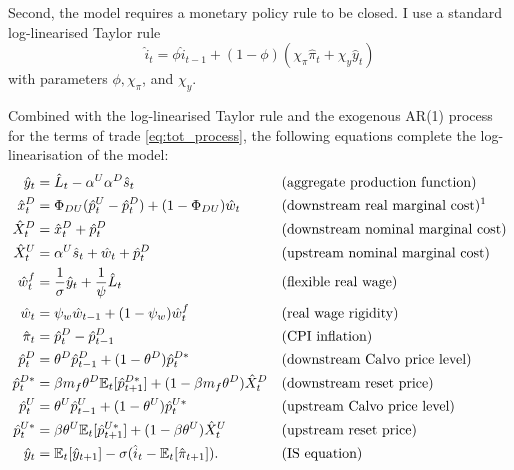 \documentclass[a4paper, 12pt]{article}
\newcommand{\E}{\mathbb{E}}
\theoremstyle{definition*}
\begin{document}
Second, the model requires a monetary policy rule to be closed.
I use a standard log-linearised Taylor rule
\begin{equation}
  \hat i_t = \phi\hat i_{t-1} + (1 - \phi)(\chi_\pi\hat\pi_t + \chi_y\hat y_t)
\end{equation}
with parameters $\phi, \chi_\pi$, and $\chi_y$.

Combined with the log-linearised Taylor rule and the exogenous AR(1) process for the terms of trade \eqref{eq:tot_process}, the following equations complete the log-linearisation of the model:
\begin{align}
  \hat{y}_t &= \hat{L}_t - \alpha^U \alpha^D \hat{s}_t && \text{(aggregate production function)} \label{eq:ll_prod} \\
  \hat{x}^D_t &= \Phi_{DU}(\hat{p}^U_t - \hat{p}^D_t) + (1-\Phi_{DU})\hat{w}_t && \text{(downstream real marginal cost)\footnotemark} \label{eq:ll_rmcD} \\
  \hat{X}^D_t &= \hat{x}^D_t + \hat{p}^D_t && \text{(downstream nominal marginal cost)} \label{eq:ll_nmcD} \\
  \hat{X}^U_t &= \alpha^U \hat{s}_t + \hat{w}_t + \hat{p}^D_t && \text{(upstream nominal marginal cost)} \label{eq:ll_nmcU} \\
  \hat w^f_t &= \frac{1}{\sigma}\hat y_t + \frac{1}{\psi}\hat{L}_t && \text{(flexible real wage)} \label{eq:ll_flexible_wage} \\
  \hat{w}_t &= \psi_w \hat{w}_{t-1} + (1-\psi_w)\hat w^f_t && \text{(real wage rigidity)} \label{eq:ll_rwr} \\
  \hat{\pi}_t &= \hat{p}^D_t - \hat{p}^D_{t-1} && \text{(CPI inflation)} \label{eq:ll_infl} \\
  \hat{p}^D_t &= \theta^D \hat{p}^D_{t-1} + (1-\theta^D)\hat{p}^{D*}_t && \text{(downstream Calvo price level)} \label{eq:ll_calvoD} \\
  \hat{p}^{D*}_t &= \beta m_f \theta^D \E_t[\hat{p}^{D*}_{t+1}] + (1-\beta m_f \theta^D)\hat{X}^D_t && \text{(downstream reset price)} \label{eq:ll_resetD} \\
  \hat{p}^U_t &= \theta^U \hat{p}^U_{t-1} + (1-\theta^U)\hat{p}^{U*}_t && \text{(upstream Calvo price level)} \label{eq:ll_calvoU} \\
  \hat{p}^{U*}_t &= \beta \theta^U \E_t[\hat{p}^{U*}_{t+1}] + (1-\beta\theta^U)\hat{X}^U_t && \text{(upstream reset price)} \label{eq:ll_resetU} \\
  \hat{y}_t &= \E_t[\hat{y}_{t+1}] - \sigma(\hat{i}_t - \E_t[\hat{\pi}_{t+1}]). && \text{(IS equation)} \label{eq:ll_IS}
\end{align}
\end{document}
